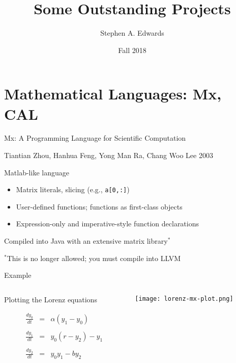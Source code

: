 \documentclass{plt}
\title{Some Outstanding Projects}
\author{Stephen A. Edwards}
\institute{Columbia University}
\date{Fall 2018}
\begin{document}
\frame{\titlepage}

\frame{\tableofcontents}

\section{Mathematical Languages: Mx, CAL}
\begin{frame}[fragile]{Mx: A Programming Language for Scientific Computation}

{\small Tiantian Zhou, Hanhua Feng, Yong Man Ra, Chang Woo Lee 2003}

Matlab-like language

\begin{itemize}
\item Matrix literals, slicing (e.g., \verb|a[0,:]|)
\item User-defined functions; functions as first-class objects
\item Expression-only and imperative-style function declarations
\end{itemize}

Compiled into Java with an extensive matrix library$^*$

$^*$This is no longer allowed; you must compile into LLVM

\end{frame}

\begin{frame}{Example}

\begin{columns}
\begin{column}{0.5\textwidth}

Plotting the Lorenz equations

\begin{eqnarray*}
\frac{dy_0}{dt} &=& \alpha(y_1-y_0) \\
\\
\frac{dy_1}{dt} &=& y_0(r-y_2) - y_1 \\
\\
\frac{dy_2}{dt} &=& y_0y_1 - by_2
\end{eqnarray*}
\end{column}
\begin{column}{0.5\textwidth}
\centerline{\texttt{[image: lorenz-mx-plot.png]}}
\end{column}
\end{columns}
\end{frame}
\end{document}
